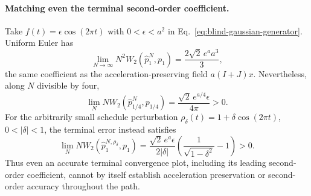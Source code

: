 \paragraph{Matching even the terminal second-order coefficient.}
Take $f(t)=\epsilon\cos(2\pi t)$ with $0<\epsilon<a^2$ in
Eq.~\eqref{eq:blind-gaussian-generator}.  Uniform Euler has
\begin{equation}
 \lim_{N\to\infty}N^2W_2(\widehat p_1^N,p_1)
 =\frac{2\sqrt2\,e^a a^3}{3},
 \label{eq:cosine-terminal-second}
\end{equation}
the same coefficient as the acceleration-preserving field $a(I+J)x$.
Nevertheless, along $N$ divisible by four,
\[
 \lim_N N W_2(\widehat p_{1/4}^N,p_{1/4})
 =\frac{\sqrt2\,e^{a/4}\epsilon}{4\pi}>0.
\]
For the arbitrarily small schedule perturbation
$\rho_\delta(t)=1+\delta\cos(2\pi t)$, $0<|\delta|<1$, the terminal
error instead satisfies
\begin{equation}
 \lim_N N W_2(\widehat p_1^{N,\rho_\delta},p_1)
 =\frac{\sqrt2\,e^a\epsilon}{2|\delta|}
       \left(\frac1{\sqrt{1-\delta^2}}-1\right)>0.
 \label{eq:cosine-perturbed-first}
\end{equation}
Thus even an accurate terminal convergence plot, including its leading
second-order coefficient, cannot by itself establish acceleration
preservation or second-order accuracy throughout the path.
